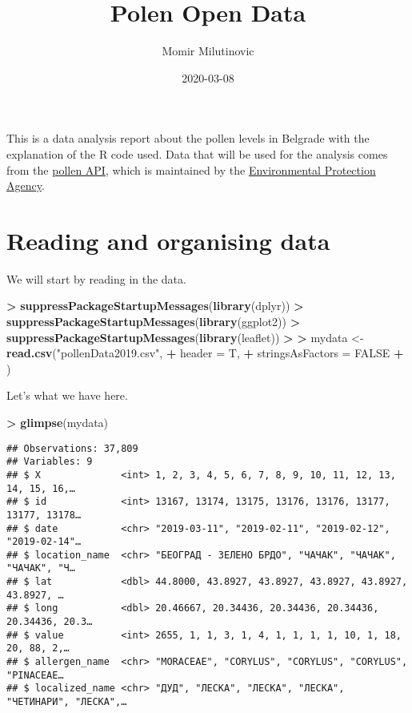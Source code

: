 \documentclass[
]{article}
\title{Polen Open Data}
\author{Momir Milutinovic}
\date{2020-03-08}
\newenvironment{Shaded}{\begin{snugshade}}{\end{snugshade}}
\newcommand{\DataTypeTok}[1]{\textcolor[rgb]{0.13,0.29,0.53}{#1}}
\newcommand{\ErrorTok}[1]{\textcolor[rgb]{0.64,0.00,0.00}{\textbf{#1}}}
\newcommand{\KeywordTok}[1]{\textcolor[rgb]{0.13,0.29,0.53}{\textbf{#1}}}
\newcommand{\NormalTok}[1]{#1}
\newcommand{\OperatorTok}[1]{\textcolor[rgb]{0.81,0.36,0.00}{\textbf{#1}}}
\newcommand{\OtherTok}[1]{\textcolor[rgb]{0.56,0.35,0.01}{#1}}
\newcommand{\StringTok}[1]{\textcolor[rgb]{0.31,0.60,0.02}{#1}}
\begin{document}
\maketitle

This is a data analysis report about the pollen levels in Belgrade with
the explanation of the R code used. Data that will be used for the
analysis comes from the
\href{http://polen.sepa.gov.rs/api/opendata/schema}{pollen API}, which
is maintained by the \href{http://sepa.gov.rs}{Environmental Protection
Agency}.

\hypertarget{reading-and-organising-data}{%
\section{Reading and organising
data}\label{reading-and-organising-data}}

We will start by reading in the data.

\begin{Shaded}
\begin{Highlighting}[]
\OperatorTok{>}\StringTok{ }\KeywordTok{suppressPackageStartupMessages}\NormalTok{(}\KeywordTok{library}\NormalTok{(dplyr))}
\OperatorTok{>}\StringTok{ }\KeywordTok{suppressPackageStartupMessages}\NormalTok{(}\KeywordTok{library}\NormalTok{(ggplot2))}
\OperatorTok{>}\StringTok{ }\KeywordTok{suppressPackageStartupMessages}\NormalTok{(}\KeywordTok{library}\NormalTok{(leaflet))}
\OperatorTok{>}\StringTok{ }
\ErrorTok{>}\StringTok{ }\NormalTok{mydata <{-}}\StringTok{ }\KeywordTok{read.csv}\NormalTok{(}\StringTok{"pollenData2019.csv"}\NormalTok{,}
\OperatorTok{+}\StringTok{                    }\DataTypeTok{header =}\NormalTok{ T,}
\OperatorTok{+}\StringTok{                    }\DataTypeTok{stringsAsFactors =} \OtherTok{FALSE}
\OperatorTok{+}\StringTok{                    }\NormalTok{)}
\end{Highlighting}
\end{Shaded}

Let's what we have here.

\begin{Shaded}
\begin{Highlighting}[]
\OperatorTok{>}\StringTok{ }\KeywordTok{glimpse}\NormalTok{(mydata)}
\end{Highlighting}
\end{Shaded}

\begin{verbatim}
## Observations: 37,809
## Variables: 9
## $ X              <int> 1, 2, 3, 4, 5, 6, 7, 8, 9, 10, 11, 12, 13, 14, 15, 16,…
## $ id             <int> 13167, 13174, 13175, 13176, 13176, 13177, 13177, 13178…
## $ date           <chr> "2019-03-11", "2019-02-11", "2019-02-12", "2019-02-14"…
## $ location_name  <chr> "БЕОГРАД - ЗЕЛЕНО БРДО", "ЧАЧАК", "ЧАЧАК", "ЧАЧАК", "Ч…
## $ lat            <dbl> 44.8000, 43.8927, 43.8927, 43.8927, 43.8927, 43.8927, …
## $ long           <dbl> 20.46667, 20.34436, 20.34436, 20.34436, 20.34436, 20.3…
## $ value          <int> 2655, 1, 1, 3, 1, 4, 1, 1, 1, 1, 10, 1, 18, 20, 88, 2,…
## $ allergen_name  <chr> "MORACEAE", "CORYLUS", "CORYLUS", "CORYLUS", "PINACEAE…
## $ localized_name <chr> "ДУД", "ЛЕСКА", "ЛЕСКА", "ЛЕСКА", "ЧЕТИНАРИ", "ЛЕСКА",…
\end{verbatim}
\end{document}
